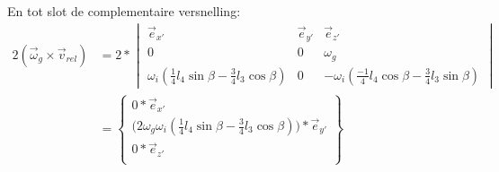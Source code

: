 \documentclass[a4paper,10pt]{article}
\begin{document}
En tot slot de complementaire versnelling:
\begin{equation}
\begin{aligned}
2(\vec{\omega}_g \times \vec{v}_{rel}) &= 2 * \begin{vmatrix}
\vec{e}_{x'} & \vec{e}_{y'} & \vec{e}_{z'}\\
0 & 0 & \omega_g \\
\omega_i  (\frac{1}{4}l_4 \sin{\beta}-\frac{3}{4}l_3  \cos{\beta}) & 0 & -\omega_i (\frac{-1}{4}l_4\cos{\beta} - \frac{3}{4}l_3  \sin{\beta})
\end{vmatrix}\\
&= \begin{Bmatrix}
0 * \vec{e}_{x'}\\
\Big(2\omega_g\omega_i(\frac{1}{4}l_4 \sin{\beta}-\frac{3}{4}l_3  \cos{\beta})\Big)*\vec{e}_{y'}\\
0 * \vec{e}_{z'}\\
\end{Bmatrix}
\end{aligned}
\end{equation}
\end{document}
